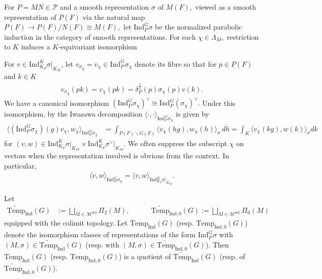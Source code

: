 \documentclass[10pt]{amsart}
\theoremstyle{definition}
\numberwithin{equation}{section}
\numberwithin{equation}{subsection}
\newcommand{\Ind}{\mathrm{Ind}}
\newcommand{\Temp}{\mathrm{Temp}}
\begin{document}
For $P=MN\in \mathcal{P}$ and a smooth representation $\sigma$ of $M(F),$ viewed as a smooth representation of $P(F)$ via the natural map $P(F)\to P(F)/N(F)\cong M(F),$ let $\mathrm{Ind}_P^G \sigma$ be the normalized parabolic induction in the category of smooth representations. For each $\chi\in\Lambda_M,$ restriction to $K$ induces a $K$-equivariant isomorphism
\begin{center}
\end{center}
For $v\in \Ind_{K_P}^{K}\sigma\vert_{K_M }$, let $v_{\sigma_\chi}=v_\chi\in \Ind_P^G\sigma_\chi$ denote its fibre so that for $p\in P(F)$ and $k\in K$
\begin{align*}
    v_{\sigma_\chi}(pk)=v_\chi(pk) = \delta_P^{\frac{1}{2}}(p)\sigma_\chi(p)v(k).
\end{align*}
We have a canonical isomorphism $(\mathrm{Ind}_P^G \sigma_\chi)^\lor\cong \Ind_{P}^G (\sigma_\chi)^\lor.$ Under this isomorphism, by the Iwasawa decomposition  $\langle\cdot,\cdot\rangle_{\mathrm{Ind}_P^G\sigma_\chi}$ is given by
\begin{align*}
    \langle (\Ind_P^G\sigma_\chi)(g)v_\chi,w_\chi\rangle_{\Ind_P^G\sigma_\chi}&=\int_{P(F)\backslash G(F)} \langle v_\chi(hg),w_\chi(h)\rangle_\sigma\, d\dot{h} = \int_K \langle v_\chi(kg),w(k)\rangle_\sigma dk
\end{align*}
for $(v,w)\in \Ind_{K_P}^{K}\sigma\vert_{K_M }\times\Ind_{K_P}^{K}\sigma^\vee\vert_{K_M }$. We often suppress the subscript $\chi$ on vectors when the representation involved is obvious from the context. In particular,
\begin{align*}
    \langle v,w\rangle_{\mathrm{Ind}_P^G\sigma_\chi}=\langle v,w\rangle_{\mathrm{Ind}_{K_P}^K \sigma|_{K_M}}.
\end{align*}



Let
\begin{align*}
    \widetilde{\Temp}_\Ind(G) &:= \bigsqcup\limits_{M\in\mathcal{M}^{\mathrm{std}}} \Pi_2(M),\quad\quad\quad    \widetilde{\Temp}_{\Ind,0}(G) := \bigsqcup\limits_{M\in\mathcal{M}^{\mathrm{std}}} \Pi_0(M)
\end{align*}
equipped with the colimit topology. Let $\Temp_\Ind(G)$ (resp. $\Temp_{\Ind,0}(G)$) denote the isomorphism classes of representations of the form $\Ind_P^G\sigma$ with $(M,\sigma)\in\widetilde{\Temp}_\Ind(G)$ (resp. with $(M,\sigma)\in\widetilde{\Temp}_{\Ind,0}(G)$). Then $\Temp_\Ind(G)$ (resp. $\Temp_{\Ind,0}(G)$) is a quotient of $\widetilde{\Temp}_\Ind(G)$ (resp. of $\widetilde{\Temp}_{\Ind,0}(G)$). 
\end{document}
